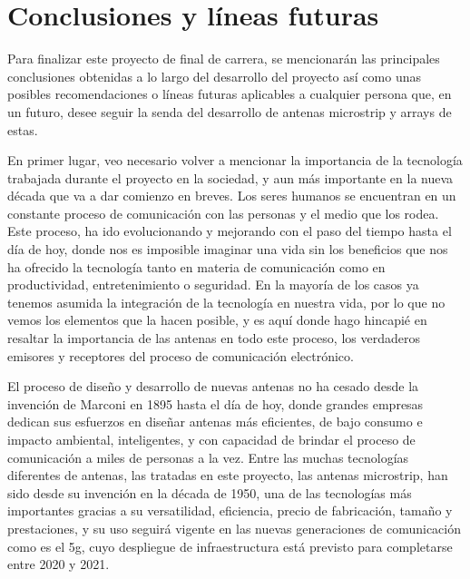 
\chapter{Conclusiones y líneas futuras}
\label{conclusiones}

\par Para finalizar este proyecto de final de carrera, se mencionarán las principales conclusiones obtenidas a lo largo del desarrollo del proyecto así como unas posibles recomendaciones o líneas futuras aplicables a cualquier persona que, en un futuro, desee seguir la senda del desarrollo de antenas microstrip y arrays de estas.
\\
\par En primer lugar, veo necesario volver a mencionar la importancia de la tecnología trabajada durante el proyecto en la sociedad, y aun más importante en la nueva década que va a dar comienzo en breves. Los seres humanos se encuentran en un constante proceso de comunicación con las personas y el medio que los rodea. Este proceso, ha ido evolucionando y mejorando con el paso del tiempo hasta el día de hoy, donde nos es imposible imaginar una vida sin los beneficios que nos ha ofrecido la tecnología tanto en materia de comunicación como en productividad, entretenimiento o seguridad. En la mayoría de los casos ya tenemos asumida la integración de la tecnología en nuestra vida, por lo que no vemos los elementos que la hacen posible, y es aquí donde hago hincapié en resaltar la importancia de las antenas en todo este proceso, los verdaderos emisores y receptores del proceso de comunicación electrónico. 
\\
\par El proceso de diseño y desarrollo de nuevas antenas no ha cesado desde la invención de Marconi en 1895 hasta el día de hoy, donde grandes empresas dedican sus esfuerzos en diseñar antenas más eficientes, de bajo consumo e impacto ambiental, inteligentes, y con capacidad de brindar el proceso de comunicación a miles de personas a la vez. Entre las muchas tecnologías diferentes de antenas, las tratadas en este proyecto, las antenas microstrip, han sido desde su invención en la década de 1950, una de las tecnologías más importantes gracias a su versatilidad, eficiencia, precio de fabricación, tamaño y prestaciones, y su uso seguirá vigente en las nuevas generaciones de comunicación como es el \gls{5g}, cuyo despliegue de infraestructura está previsto para completarse entre 2020 y 2021. 
